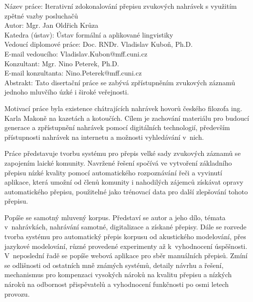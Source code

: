 \noindent Název práce: Iterativní zdokonalování přepisu zvukových nahrávek s využitím zpětné vazby posluchačů\\
Autor: Mgr. Jan Oldřich Krůza\\
Katedra (ústav): Ústav formální a aplikované lingvistiky\\
Vedoucí diplomové práce: Doc. RNDr. Vladislav Kuboň, Ph.D.\\
E-mail vedoucího: Vladislav.Kubon@mff.cuni.cz\\
Konzultant: Mgr. Nino Peterek, Ph.D.\\
E-mail konzultanta: Nino.Peterek@mff.cuni.cz\\

\noindent Abstrakt: Tato disertační práce se zabývá zpřístupněním zvukových
záznamů jednoho mluvčího úzké i široké veřejnosti.

Motivací práce byla existence chátrajících nahrávek hovorů českého filozofa
ing. Karla Makoně na kazetách a kotoučích. Cílem je zachování materiálu pro
budoucí generace a zpřístupnění nahrávek pomocí digitálních technologií,
především přístupnosti nahrávek na internetu a možnosti vyhledávání v~nich.

Práce představuje tvorbu systému pro přepis velké sady zvukových záznamů
se zapojením laické komunity. Navržené řešení spočívá ve vytvoření základního
přepisu nízké kvality pomocí automatického rozpoznávání řeči a vyvinutí
aplikace, která umožní od členů komunity i nahodilých zájemců získávat opravy
automatického přepisu, použitelné jako trénovací data pro další zlepšování
tohoto přepisu.

Popíše se samotný mluvený korpus. Představí se autor a
jeho dílo,
témata v~nahrávkách, nahrávání samotné, digitalizace a získané přepisy.
Dále se rozvede tvorba systému pro automatický
přepis korpusu od akustického modelování, přes jazykové modelování, různé
provedené experimenty až k~vyhodnocení úspěšnosti. V~neposlední řadě se popíše
webová aplikace pro sběr manuálních přepisů. Zmíní se odlišnosti od ostatních mně známých
systémů, detaily návrhu a řešení, mechanismus pro kompenzaci vysokých nároků na kvalitu
přepisu a nízkých nároků na odbornost přispěvatelů a vyhodnocení funkčnosti
po osmi letech provozu.


\vspace{10mm}

